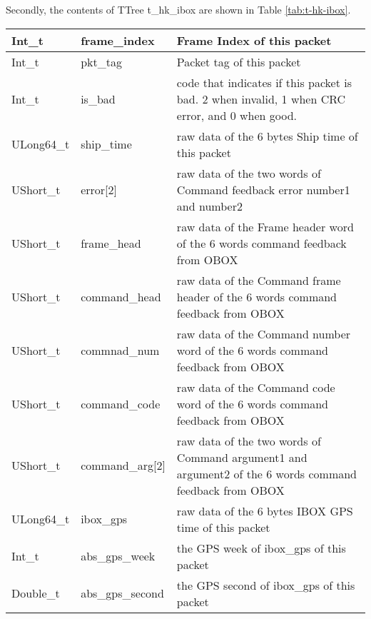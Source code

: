 \documentclass[a4paper, 12pt, onecolumn]{article}
\begin{document}
Secondly, the contents of TTree t\_hk\_ibox are shown in Table \ref{tab:t-hk-ibox}.
\vspace{5mm}
\begin{center}
  \label{tab:t-hk-ibox}    
  \tablelasttail{\hline}
  \begin{supertabular}{| p{18mm} | p{38mm} | p{66mm} |}
    Int\_t      & frame\_index             & Frame Index of this packet \\\hline
    Int\_t      & pkt\_tag                 & Packet tag of this packet \\\hline
    Int\_t      & is\_bad                  & code that indicates if this packet is bad. 2 when invalid, 1 when CRC error, and 0 when good. \\\hline
    ULong64\_t   & ship\_time               & raw data of the 6 bytes Ship time of this packet \\\hline
    UShort\_t   & error[2]                 & raw data of the two words of Command feedback error number1 and number2 \\\hline
    UShort\_t   & frame\_head              & raw data of the Frame header word of the 6 words command feedback from OBOX \\\hline
    UShort\_t   & command\_head            & raw data of the Command frame header of the 6 words command feedback from OBOX \\\hline
    UShort\_t   & commnad\_num             & raw data of the Command number word of the 6 words command feedback from OBOX \\\hline
    UShort\_t   & command\_code            & raw data of the Command code word of the 6 words command feedback from OBOX \\\hline
    UShort\_t   & command\_arg[2]          & raw data of the two words of Command argument1 and argument2 of the 6 words command feedback from OBOX \\\hline
    ULong64\_t  & ibox\_gps                & raw data of the 6 bytes IBOX GPS time of this packet \\\hline
    Int\_t      & abs\_gps\_week           & the GPS week of ibox\_gps of this packet \\\hline
    Double\_t   & abs\_gps\_second         & the GPS second of ibox\_gps of this packet \\ 
  \end{supertabular}
\end{center}
\end{document}
